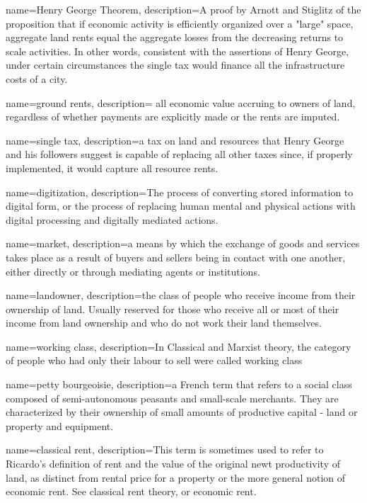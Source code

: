 {
name=Henry George Theorem,
description={A proof by Arnott and Stiglitz \cite{arnottAggregateLandRents1979} of the proposition that if economic activity is efficiently organized over a "large" space, aggregate land rents equal the aggregate losses from the decreasing returns to scale activities. In other words, consistent with the assertions of Henry George, under certain circumstances the \gls{single tax} would finance all the infrastructure costs of a city. }
}

{
name=ground rents,
description={ all economic value accruing to owners of land, regardless of whether payments are explicitly made or the rents are imputed.}
}

{
name=single tax,
description={a tax on land and resources that Henry George and his followers suggest is capable of replacing all other taxes since, if properly implemented, it would capture all resource rents. }
}

{
name=digitization,
description={The process of converting stored information to digital form, or the process of replacing human mental and physical actions with digital processing and digitally mediated actions.}
}

{
name=market,
description={a means by which the exchange of goods and services takes place as a result of buyers and sellers being in contact with one another, either directly or through mediating agents or institutions.}%
}

{
name=landowner,
description={the class of people who receive income from their ownership of land. Usually reserved for those who receive all or most of their income from land ownership and who do not work their land themselves.}
}

{
name=working class,
description={In Classical and Marxist theory, the category of people who had only their labour to sell were called working class}
}


{
name=petty bourgeoisie,
description={a French term that refers to a social class composed of semi-autonomous peasants and small-scale merchants. They are characterized by their ownership of small amounts of productive capital - land or property and equipment.}
}

{
name=classical rent,
description={This term is sometimes used to refer to Ricardo's definition of rent and the value of the original newt productivity of land, as distinct from rental price for a property or the more general notion of economic rent. See \gls{classical rent theory}, or \gls{economic rent}.}
}

